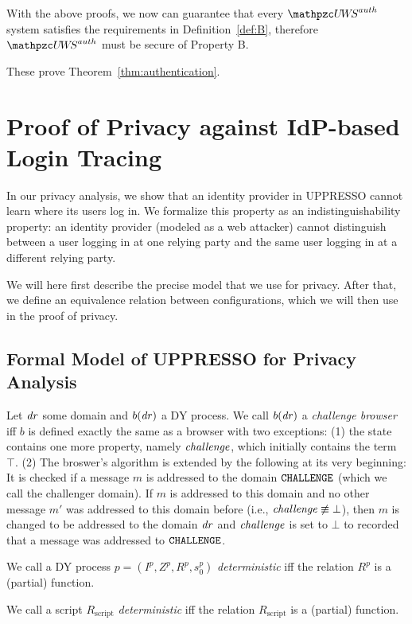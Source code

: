   With the above proofs, we now can guarantee that every 
  $\uppressoauthwebsystem$ system satisfies the requirements in 
  Definition~\ref{def:B}, therefore $\uppressoauthwebsystem$ 
  must be secure of Property B.
  
  These prove Theorem~\ref{thm:authentication}.\QED
  
  \section{Proof of Privacy against IdP-based Login Tracing}
  
  In our privacy analysis, we show that an identity provider in UPPRESSO cannot learn 
  where its users log in. We formalize this property as an indistinguishability 
  property: an identity provider (modeled as a web attacker) cannot distinguish 
  between a user logging in at one relying party and the same user logging in at 
  a different relying party.
  
  We will here first describe the precise model that we use for privacy.
  After that, we define an equivalence relation between configurations,
  which we will then use in the proof of privacy.
  
  \subsection{Formal Model of UPPRESSO for Privacy Analysis}
  
  \begin{definition}
    Let $\mathit{dr}$ some domain and $b(\mathit{dr})$ a DY process. 
    We call $b(\mathit{dr})$ a \emph{challenge browser} iff $b$
    is defined exactly the same as a browser with two exceptions: 
    (1) the state contains one more property, namely 
    $\mathit{challenge}$, which initially contains the term $\top$. 
    (2) The broswer's algorithm is extended by the following at 
    its very beginning: It is checked if a message $m$ is 
    addressed to the domain $\mathtt{CHALLENGE}$ (which we call the 
    challenger domain). If $m$ is addressed to this domain and 
    no other message $m'$ was addressed to this domain before 
    (i.e., $\mathit{challenge} \not\equiv \bot$), then $m$ is changed 
    to be addressed to the domain $\mathit{dr}$ and $\mathit{challenge}$ 
    is set to $\bot$ to recorded that a message was addressed to 
    $\mathtt{CHALLENGE}$.
  \end{definition}
  
  \begin{definition}
    We call a DY process $p = (I^p,Z^p,R^p,s_0^p)$ \emph{deterministic} iff 
    the relation $R^p$ is a (partial) function.
  
    We call a script $R_\text{script}$ \emph{deterministic} iff the relation 
    $R_\text{script}$ is a (partial) function.
  \end{definition}
  
